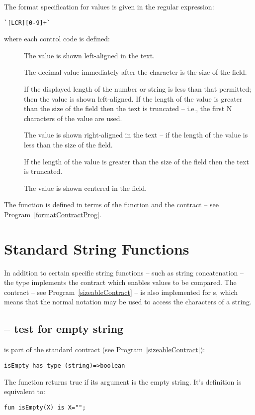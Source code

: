 The format specification for  values is given in the regular expression:
\begin{lstlisting}
`[LCR][0-9]+`
\end{lstlisting}
where each control code is defined:
\begin{description}
\item[] 
The value is shown left-aligned in the text.

The decimal value immediately after the  character is the size of the field.

If the displayed length of the number or string is less than that permitted; then the value is shown left-aligned. If the length of the value is greater than the size of the field then the text is truncated -- i.e., the first N characters of the value are used.

\item[] The value is shown right-aligned in the text -- if the length of the value is less than the size of the field.

If the length of the value is greater than the size of the field then the text is truncated.

\item[] The value is shown centered in the field. 
\end{description}

\begin{aside}
The  function is defined in terms of the  function and the  contract -- see Program~\vref{formatContractProg}.
\end{aside}

\section{Standard String Functions}
\label{simpleString}
In addition to certain specific string functions -- such as string concatenation -- the  type implements the  contract which enables  values to be compared. The  contract -- see Program~\vref{sizeableContract} -- is also implemented for s, which means that the normal \q{[]} notation may be used to access the characters of a string.

\subsection{ -- test for empty string}
\label{stringEmptyFunction}
 is part of the standard  contract (see Program~\vref{sizeableContract}):
\begin{lstlisting}
isEmpty has type (string)=>boolean
\end{lstlisting}
The  function returns true if its argument is the empty string. It's definition is equivalent to:
\begin{lstlisting}
fun isEmpty(X) is X="";
\end{lstlisting}


